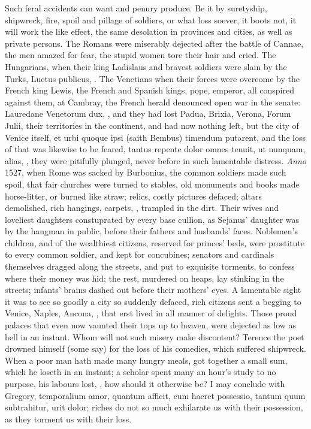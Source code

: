 {Such feral accidents can want and penury produce. Be it by suretyship,
shipwreck, fire, spoil and pillage of soldiers, or what loss soever, it
boots not, it will work the like effect, the same desolation in
provinces and cities, as well as private persons. The Romans were
miserably dejected after the battle of Cannae, the men amazed for fear,
the stupid women tore their hair and cried. The Hungarians, when their
king Ladislaus and bravest soldiers were slain by the Turks, Luctus
publicus, \etc{}. The Venetians when their forces were overcome by the
French king Lewis, the French and Spanish kings, pope, emperor, all
conspired against them, at Cambray, the French herald denounced open
war in the senate: Lauredane Venetorum dux, \etc{}, and they had lost
Padua, Brixia, Verona, Forum Julii, their territories in the continent,
and had now nothing left, but the city of Venice itself, et urbi quoque
ipsi (saith Bembus) timendum putarent, and the loss of that was
likewise to be feared, tantus repente dolor omnes tenuit, ut nunquam,
alias, \etc{}, they were pitifully plunged, never before in such
lamentable distress. \emph{Anno} 1527, when Rome was sacked by Burbonius,
the common soldiers made such spoil, that fair churches were
turned to stables, old monuments and books made horse-litter, or burned
like straw; relics, costly pictures defaced; altars demolished, rich
hangings, carpets, \etc{}, trampled in the dirt. Their wives and
loveliest daughters constuprated by every base cullion, as Sejanus'
daughter was by the hangman in public, before their fathers and
husbands' faces. Noblemen's children, and of the wealthiest citizens,
reserved for princes' beds, were prostitute to every common soldier,
and kept for concubines; senators and cardinals themselves dragged
along the streets, and put to exquisite torments, to confess where
their money was hid; the rest, murdered on heaps, lay stinking in the
streets; infants' brains dashed out before their mothers' eyes. A
lamentable sight it was to see so goodly a city so suddenly defaced,
rich citizens sent a begging to Venice, Naples, Ancona, \etc{}, that erst
lived in all manner of delights. Those proud palaces that even
now vaunted their tops up to heaven, were dejected as low as hell in an
instant. Whom will not such misery make discontent? Terence the poet
drowned himself (some say) for the loss of his comedies, which suffered
shipwreck. When a poor man hath made many hungry meals, got together a
small sum, which he loseth in an instant; a scholar spent many an
hour's study to no purpose, his labours lost, \etc{}, how should it
otherwise be? I may conclude with Gregory, temporalium amor, quantum
afficit, cum haeret possessio, tantum quum subtrahitur, urit dolor;
riches do not so much exhilarate us with their possession, as they
torment us with their loss.

}
